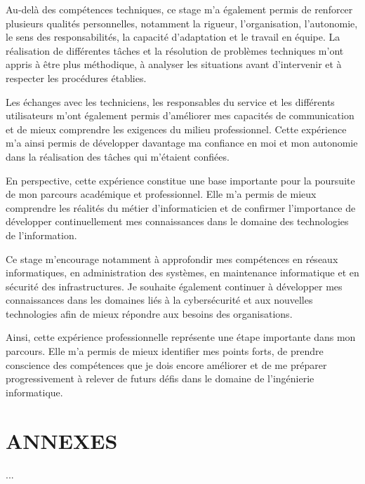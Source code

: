 \documentclass[12pt,a4paper]{article}
\begin{document}
Au-delà des compétences techniques, ce stage m’a également permis de renforcer plusieurs qualités personnelles, notamment la rigueur, l’organisation, l’autonomie, le sens des responsabilités, la capacité d’adaptation et le travail en équipe. La réalisation de différentes tâches et la résolution de problèmes techniques m’ont appris à être plus méthodique, à analyser les situations avant d’intervenir et à respecter les procédures établies.

Les échanges avec les techniciens, les responsables du service et les différents utilisateurs m’ont également permis d’améliorer mes capacités de communication et de mieux comprendre les exigences du milieu professionnel. Cette expérience m’a ainsi permis de développer davantage ma confiance en moi et mon autonomie dans la réalisation des tâches qui m’étaient confiées.



En perspective, cette expérience constitue une base importante pour la poursuite de mon parcours académique et professionnel. Elle m’a permis de mieux comprendre les réalités du métier d’informaticien et de confirmer l’importance de développer continuellement mes connaissances dans le domaine des technologies de l’information.

Ce stage m’encourage notamment à approfondir mes compétences en réseaux informatiques, en administration des systèmes, en maintenance informatique et en sécurité des infrastructures. Je souhaite également continuer à développer mes connaissances dans les domaines liés à la cybersécurité et aux nouvelles technologies afin de mieux répondre aux besoins des organisations.

Ainsi, cette expérience professionnelle représente une étape importante dans mon parcours. Elle m’a permis de mieux identifier mes points forts, de prendre conscience des compétences que je dois encore améliorer et de me préparer progressivement à relever de futurs défis dans le domaine de l’ingénierie informatique.



\section*{ANNEXES}

...
\end{document}

